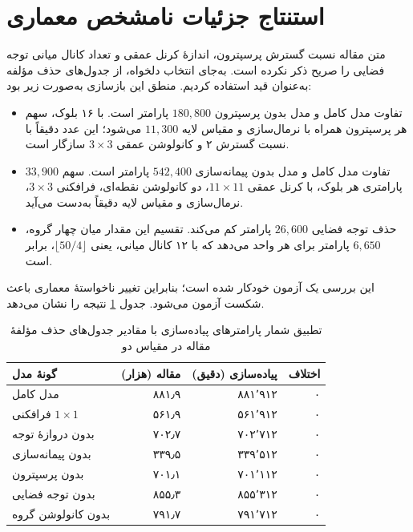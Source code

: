 \section{استنتاج جزئیات نامشخص معماری}

متن مقاله نسبت گسترش پرسپترون، اندازهٔ کرنل عمقی و تعداد کانال میانی توجه فضایی را صریح ذکر نکرده است. به‌جای انتخاب دلخواه، از جدول‌های حذف مؤلفه به‌عنوان قید استفاده کردیم. منطق این بازسازی به‌صورت زیر بود:

\begin{itemize}
    \item تفاوت مدل کامل و مدل بدون پرسپترون $180{,}800$ پارامتر است. با ۱۶ بلوک، سهم هر پرسپترون همراه با نرمال‌سازی و مقیاس لایه $11{,}300$ می‌شود؛ این عدد دقیقاً با نسبت گسترش ۲ و کانولوشن عمقی $3\times3$ سازگار است.
    \item تفاوت مدل کامل و مدل بدون پیمانه‌سازی $542{,}400$ پارامتر است. سهم $33{,}900$ پارامتری هر بلوک، با کرنل عمقی $11\times11$، دو کانولوشن نقطه‌ای، فرافکنی $3\times3$، نرمال‌سازی و مقیاس لایه دقیقاً به‌دست می‌آید.
    \item حذف توجه فضایی $26{,}600$ پارامتر کم می‌کند. تقسیم این مقدار میان چهار گروه، $6{,}650$ پارامتر برای هر واحد می‌دهد که با ۱۲ کانال میانی، یعنی $\lfloor50/4\rfloor$، برابر است.
\end{itemize}

این بررسی یک آزمون خودکار شده است؛ بنابراین تغییر ناخواستهٔ معماری باعث شکست آزمون می‌شود. جدول \ref{tab:param-ablation} نتیجه را نشان می‌دهد.

\begin{table}[H]
\centering
\caption{تطبیق شمار پارامترهای پیاده‌سازی با مقادیر جدول‌های حذف مؤلفهٔ مقاله در مقیاس دو}
\label{tab:param-ablation}
\begin{tabular}{lrrr}
\toprule
گونهٔ مدل & مقاله (هزار) & پیاده‌سازی (دقیق) & اختلاف \\
\midrule
مدل کامل & ۸۸۱٫۹ & ۸۸۱٬۹۱۲ & ۰ \\
فرافکنی $1\times1$ & ۵۶۱٫۹ & ۵۶۱٬۹۱۲ & ۰ \\
بدون دروازهٔ توجه & ۷۰۲٫۷ & ۷۰۲٬۷۱۲ & ۰ \\
بدون پیمانه‌سازی & ۳۳۹٫۵ & ۳۳۹٬۵۱۲ & ۰ \\
بدون پرسپترون & ۷۰۱٫۱ & ۷۰۱٬۱۱۲ & ۰ \\
بدون توجه فضایی & ۸۵۵٫۳ & ۸۵۵٬۳۱۲ & ۰ \\
بدون کانولوشن گروه & ۷۹۱٫۷ & ۷۹۱٬۷۱۲ & ۰ \\
\bottomrule
\end{tabular}
\end{table}

